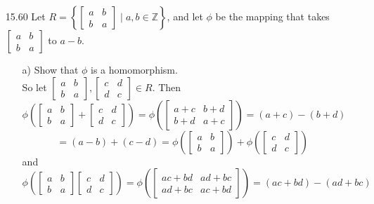 \documentclass[12pt]{article}
\begin{document}
\begin{enumerate}
\item[15.60] Let $R = 
\left\{ \left[
\begin{array}{cc} a & b \\ b & a \end{array}
\right] \mid a, b \in \mathbb{Z}
\right\}$, and let $\phi$ be the mapping that takes 
$\left[ \begin{array}{cc} a & b \\ b & a \end{array} \right]$ to $a - b$.
\begin{enumerate}
\item[a)] Show that $\phi$ is a homomorphism.\\
So let $\left[ \begin{array}{cc} a & b \\ b & a \end{array} \right], 
\left[ \begin{array}{cc} c & d \\ d & c \end{array} \right] \in R$. Then
\[
\phi(\left[ \begin{array}{cc} a & b \\ b & a \end{array} \right] + 
\left[ \begin{array}{cc} c & d \\ d & c \end{array} \right]) = 
\phi(\left[ \begin{array}{cc} a + c & b + d\\ b + d & a + c \end{array} \right]) = (a + c) - (b + d) 
\]
\[ 
= (a - b) + (c - d) = \phi(\left[ \begin{array}{cc} a & b \\ b & a \end{array} \right]) + 
\phi(\left[ \begin{array}{cc} c & d \\ d & c \end{array} \right])
\]
and 
\[
\phi(\left[ \begin{array}{cc} a & b \\ b & a \end{array} \right]\left[ \begin{array}{cc} c & d \\ d & c \end{array} \right])
= \phi(\left[ \begin{array}{cc} ac + bd & ad + bc \\ ad + bc & ac + bd \end{array} \right]) = (ac + bd) - (ad + bc)
\]
\end{enumerate}
\end{enumerate}
\end{document}
